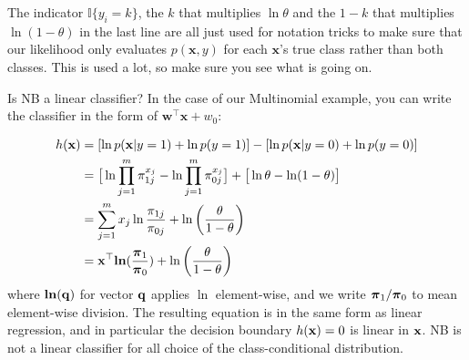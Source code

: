 \documentclass[11pt,letterpaper]{article}
\begin{document}
The indicator $\mathbb{I}\{y_i=k\}$, the $k$ that multiplies $\ln\theta$ and the $1-k$ that multiplies $\ln(1 - \theta)$ in the last line
are all  just used for notation tricks to make sure that our likelihood only evaluates $p(\mathbf{x},y)$ for each $\mathbf{x}$'s true class
rather than both classes. This is used a lot, so make sure you see what is going on.

Is NB a linear classifier? In the case of our Multinomial example, you can write the classifier
in the form of $\mathbf{w}^\top\mathbf{x} + w_0$:

  \begin{align*}
    h(\mathbf{x} ) &= [\ln p(\mathbf{x} | y=1) + \ln p(y=1)] - [\ln p(\mathbf{x} | y=0) + \ln p(y=0)] \\ 
    &= \big[\ln \prod_{j=1}^m \pi_{1j}^{x_j} - \ln \prod_{j=1}^m \pi_{0j}^{x_j} \big] + \big[\ln \theta - \ln (1-\theta)\big]   \\
    &= \sum_{j=1}^m x_j \ln \frac{\pi_{1j}}{ \pi_{0j}} +  \ln \left(\frac{\theta} {1-\theta}\right)  \\
    &= \mathbf{x}^\top \bold{ln}(\frac{\boldsymbol{\pi}_{1}}{ \boldsymbol{\pi}_{0}}) +  \ln \left(\frac{\theta} {1-\theta}\right) 
  \end{align*} 
%
where $\bold{ln}(\mathbf{q})$ for vector $\mathbf{q}$ applies $\ln$ element-wise, and 
we write $\boldsymbol{\pi}_{1}/ \boldsymbol{\pi}_{0}$ to mean element-wise division.
%
The resulting equation is in the same form as linear regression, and
in particular the decision boundary $h(\mathbf{x})=0$ is linear in $\mathbf{x}$. 
NB is not a linear classifier for all choice of the class-conditional distribution.


\newpage
\end{document}
